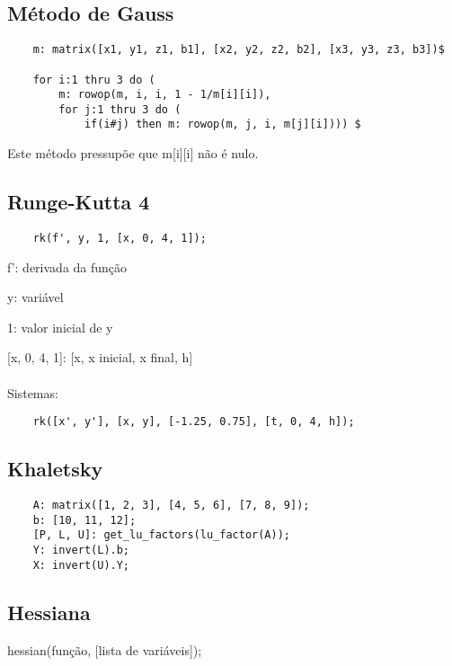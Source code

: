 \documentclass[../resumosMNUM.tex]{subfiles}
\begin{document}
 

\subsection{Método de Gauss}

\begin{lstlisting}
    m: matrix([x1, y1, z1, b1], [x2, y2, z2, b2], [x3, y3, z3, b3])$
    
    for i:1 thru 3 do (
        m: rowop(m, i, i, 1 - 1/m[i][i]),
        for j:1 thru 3 do (
            if(i#j) then m: rowop(m, j, i, m[j][i]))) $
\end{lstlisting}

Este método pressupõe que m[i][i] não é nulo.


\subsection{Runge-Kutta 4}

\begin{lstlisting}
    rk(f', y, 1, [x, 0, 4, 1]);
\end{lstlisting}

f': derivada da função

y: variável

1: valor inicial de y

[x, 0, 4, 1]: [x, x inicial, x final, h]

\paragraph{}

Sistemas: 

\begin{lstlisting}
    rk([x', y'], [x, y], [-1.25, 0.75], [t, 0, 4, h]);
\end{lstlisting}

\subsection{Khaletsky}

\begin{lstlisting}
    A: matrix([1, 2, 3], [4, 5, 6], [7, 8, 9]);
    b: [10, 11, 12];
    [P, L, U]: get_lu_factors(lu_factor(A));
    Y: invert(L).b;
    X: invert(U).Y;
\end{lstlisting}

\subsection{Hessiana}

\qquad hessian(função, [lista de variáveis]);
\end{document}
